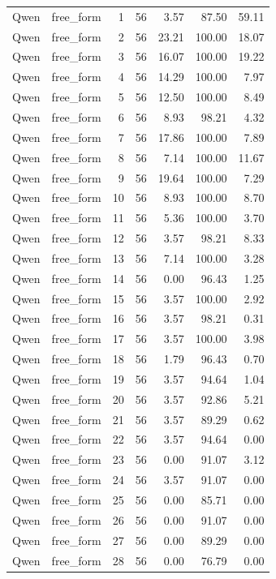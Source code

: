 \begin{longtable}{llrrrrr}
Qwen & free\_form & 1 & 56 & 3.57 & 87.50 & 59.11 \\
Qwen & free\_form & 2 & 56 & 23.21 & 100.00 & 18.07 \\
Qwen & free\_form & 3 & 56 & 16.07 & 100.00 & 19.22 \\
Qwen & free\_form & 4 & 56 & 14.29 & 100.00 & 7.97 \\
Qwen & free\_form & 5 & 56 & 12.50 & 100.00 & 8.49 \\
Qwen & free\_form & 6 & 56 & 8.93 & 98.21 & 4.32 \\
Qwen & free\_form & 7 & 56 & 17.86 & 100.00 & 7.89 \\
Qwen & free\_form & 8 & 56 & 7.14 & 100.00 & 11.67 \\
Qwen & free\_form & 9 & 56 & 19.64 & 100.00 & 7.29 \\
Qwen & free\_form & 10 & 56 & 8.93 & 100.00 & 8.70 \\
Qwen & free\_form & 11 & 56 & 5.36 & 100.00 & 3.70 \\
Qwen & free\_form & 12 & 56 & 3.57 & 98.21 & 8.33 \\
Qwen & free\_form & 13 & 56 & 7.14 & 100.00 & 3.28 \\
Qwen & free\_form & 14 & 56 & 0.00 & 96.43 & 1.25 \\
Qwen & free\_form & 15 & 56 & 3.57 & 100.00 & 2.92 \\
Qwen & free\_form & 16 & 56 & 3.57 & 98.21 & 0.31 \\
Qwen & free\_form & 17 & 56 & 3.57 & 100.00 & 3.98 \\
Qwen & free\_form & 18 & 56 & 1.79 & 96.43 & 0.70 \\
Qwen & free\_form & 19 & 56 & 3.57 & 94.64 & 1.04 \\
Qwen & free\_form & 20 & 56 & 3.57 & 92.86 & 5.21 \\
Qwen & free\_form & 21 & 56 & 3.57 & 89.29 & 0.62 \\
Qwen & free\_form & 22 & 56 & 3.57 & 94.64 & 0.00 \\
Qwen & free\_form & 23 & 56 & 0.00 & 91.07 & 3.12 \\
Qwen & free\_form & 24 & 56 & 3.57 & 91.07 & 0.00 \\
Qwen & free\_form & 25 & 56 & 0.00 & 85.71 & 0.00 \\
Qwen & free\_form & 26 & 56 & 0.00 & 91.07 & 0.00 \\
Qwen & free\_form & 27 & 56 & 0.00 & 89.29 & 0.00 \\
Qwen & free\_form & 28 & 56 & 0.00 & 76.79 & 0.00 \\

\end{longtable}
